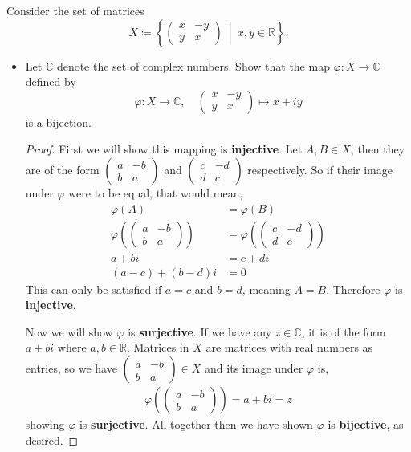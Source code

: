 \documentclass[11pt]{article}
\newenvironment{problem}[2][Problem\!]{\begin{trivlist}
\item[\hskip \labelsep {\bfseries #1}\hskip \labelsep {\bfseries #2.}]}{\end{trivlist}}
\newcommand{\rr}{\mathbb R}   %
\newcommand{\cc}{\mathbb C}   %
\newcommand{\setp}[2]{\left\{#1\ \middle|\ #2\right\}} %
\newcommand{\lrp}[1]{\left(#1\right)}
\renewcommand{\phi}{\varphi}
\begin{document}
\newpage
\begin{problem}{1.2}
Consider the set of matrices
\[X \coloneqq \setp{\begin{pmatrix}x & -y\\ y & x \end{pmatrix}}{x,y \in \rr}.\]
\begin{itemize}
\item[(a)] Let $\cc$ denote the set of complex numbers. Show that the map $\phi: X \to \cc$ defined by 
\[\phi:X \to \cc,\quad \begin{pmatrix}x & -y\\ y & x \end{pmatrix} \mapsto x + iy\]
is a bijection.
\begin{example}
    \begin{proof}
        First we will show this mapping is \textbf{injective}. Let $A,B\in X$, then they are of the form $\begin{pmatrix}
            a & -b \\ b & a
        \end{pmatrix}$ and $\begin{pmatrix}
            c & -d \\ d & c
        \end{pmatrix}$ respectively. So if their image under $\phi$ were to be equal, that would mean, 
        \begin{align*}
            \phi(A) &= \phi(B) \\
            \phi\lrp{\begin{pmatrix}
            a & -b \\ b & a
        \end{pmatrix}} &= \phi\lrp{\begin{pmatrix}
            c & -d \\ d & c
        \end{pmatrix}} \\
            a + bi &= c + di \\
            (a-c) + (b - d)i &= 0
        \end{align*}
        This can only be satisfied if $a = c$ and $b = d$, meaning $A = B$. Therefore $\phi$ is \textbf{injective}. 

        Now we will show $\phi$ is \textbf{surjective}. If we have any $z \in \cc$, it is of the form $a + bi$ where $a,b \in \rr$. Matrices in $X$ are matrices with real numbers as entries, so we have $\begin{pmatrix} a & -b \\ b & a\end{pmatrix}\in X$ and its image under $\phi$ is,
        \begin{align*}
            \phi\lrp{\begin{pmatrix} a & -b \\ b & a\end{pmatrix}} = a +bi = z 
        \end{align*}
        showing $\phi$ is \textbf{surjective}. All together then we have shown $\phi$ is \textbf{bijective}, as desired. 
    \end{proof}
\end{example} 


\end{itemize}
\end{problem}
\end{document}
